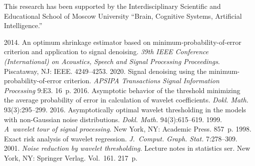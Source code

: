 




\Ack
\noindent
This research has been supported by the Interdisciplinary Scientific and Educational 
School of Moscow University ``Brain, Cognitive Systems, Artificial Intelligence.''



  \begin{multicols}{2}

\renewcommand{\bibname}{\protect\rmfamily References}

{\small\frenchspacing
 {%
 \begin{thebibliography}{9}
 2014. 
An optimum shrinkage estimator based on minimum-probability-of-error criterion and application to signal 
denoising. \textit{39th IEEE Conference (International) on Acoustics, Speech and Signal Processing Proceedings}. 
Piscataway, NJ: IEEE. 4249--4253.
 2020. Signal denoising using the minimum-probability-of-error criterion. 
 \textit{APSIPA Transactions Signal Information Processing} 9:E3. 16~p.
 2016. Asymptotic behavior of the threshold minimizing the average probability of error in calculation of 
 wavelet coefficients. \textit{Dokl. Math.} 93(3):295--299.
 2016. Asymptotically optimal wavelet thresholding in the models with non-Gaussian noise distributions. 
 \textit{Dokl. Math.} 94(3):615--619.
 1999. \textit{A~wavelet tour of signal processing}. New York, NY: Academic Press. 857~p.
 1998. Exact risk analysis of wavelet regression. \textit{J.~Comput. Graph. Stat.} 7:278--309.
 2001. 
\textit{Noise reduction by wavelet thresholding}. 
Lecture notes in statistics ser. New York, NY: Springer Verlag. Vol.~161. 217~p.
 \end{thebibliography}

 }
 }

\end{multicols}

